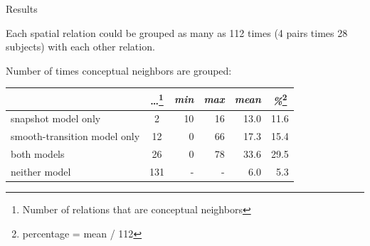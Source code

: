 \begin{frame}{Results}
	\begin{block}{ }
	Each spatial relation could be grouped as many as 112 times (4 pairs times 28 subjects) with each other relation.
	\end{block}
	\begin{block}{Number of times conceptual neighbors are grouped:}
		\begin{center}
			\begin{tabular}{|l|c|rrrr|}
				\hline
				 & \dots\footnote{Number of relations that are conceptual neighbors} & \multicolumn{1}{c}{\textit{min}} & \multicolumn{1}{c}{\textit{max}} & \multicolumn{1}{c}{\textit{mean}} & \multicolumn{1}{c|}{\textit{\%}\footnote{percentage = mean / 112}} \\
				\hline
				snapshot model only & 2 & 10 & 16 & 13.0 & 11.6 \\
				smooth-transition model only & 12 & 0 & 66 & 17.3 & 15.4 \\
				both models & 26 & 0 & 78 & 33.6 & 29.5 \\
				neither model & 131 & - & - & 6.0 & 5.3 \\
				\hline
			\end{tabular}
		\end{center}
	\end{block}
\end{frame}

